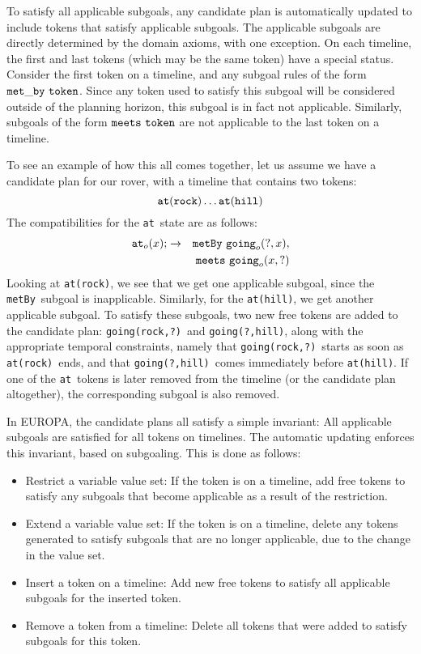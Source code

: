 To satisfy all applicable subgoals, any candidate plan is
automatically updated to include tokens that satisfy applicable
subgoals.  The applicable subgoals are directly determined by the
domain axioms, with one exception.  On each timeline, the first and
last tokens (which may be the same token) have a special status. 
Consider the first token on a timeline, and any subgoal rules of the
form ${\tt met\_by}\ {\tt token}$.  Since any token used to satisfy
this subgoal will be considered outside of the planning horizon, this
subgoal is in fact not applicable.  Similarly, subgoals of the form
${\tt meets}\ {\tt token}$ are not applicable to the last token on a
timeline.

To see an example of how this all comes together, let us assume we
have a candidate plan for our rover, with a timeline that contains two
tokens:
  $${\tt at(rock)} \ldots {\tt at(hill)}$$
  The compatibilities for the {\tt at}\ state are as follows:
  \begin{eqnarray*} 
  {\tt at}_{o} (x); 
  &\rightarrow & 
  {\tt metBy} \  {\tt going}_o(?,x), \\
  && {\tt meets} \  {\tt going}_o(x,?)
  \end{eqnarray*}
  Looking at {\tt at(rock)}, we see that we get one applicable
subgoal, since the {\tt metBy}\ subgoal is inapplicable.  Similarly,
for the {\tt at(hill)}, we get another applicable subgoal.  To satisfy
these subgoals, two new free tokens are added to the candidate plan:
{\tt going(rock,?)}\ and {\tt going(?,hill)}, along with the
appropriate temporal constraints, namely that {\tt going(rock,?)}\
starts as soon as {\tt at(rock)}\ ends, and that {\tt going(?,hill)}\
comes immediately before {\tt at(hill)}.  If one of the {\tt at}\
tokens is later removed from the timeline (or the candidate plan
altogether), the corresponding subgoal is also removed.

In EUROPA, the candidate plans all satisfy a simple invariant: All
applicable subgoals are satisfied for all tokens on timelines.  The
automatic updating enforces this invariant, based on subgoaling.  This
is done as follows:
  \begin{itemize}
  \item Restrict a variable value set: If the token is on a timeline,
add free tokens to satisfy any subgoals that become applicable as a
result of the restriction.
  \item Extend a variable value set: If the token is on a timeline,
delete any tokens generated to satisfy subgoals that are no longer
applicable, due to the change in the value set.
  \item Insert a token on a timeline: Add new free tokens to satisfy
all applicable subgoals for the inserted token.
  \item Remove a token from a timeline: Delete all tokens that were
added to satisfy subgoals for this token.
  \end{itemize}

